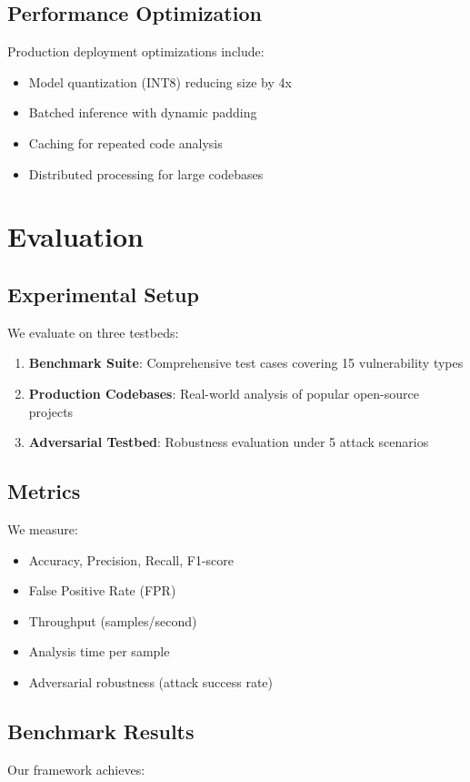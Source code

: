 \documentclass[10pt,journal,compsoc]{IEEEtran}
\begin{document}
\subsection{Performance Optimization}
Production deployment optimizations include:
\begin{itemize}
\item Model quantization (INT8) reducing size by 4x
\item Batched inference with dynamic padding
\item Caching for repeated code analysis
\item Distributed processing for large codebases
\end{itemize}

\section{Evaluation}

\subsection{Experimental Setup}
We evaluate on three testbeds:
\begin{enumerate}
\item \textbf{Benchmark Suite}: Comprehensive test cases covering 15 vulnerability types
\item \textbf{Production Codebases}: Real-world analysis of popular open-source projects
\item \textbf{Adversarial Testbed}: Robustness evaluation under 5 attack scenarios
\end{enumerate}

\subsection{Metrics}
We measure:
\begin{itemize}
\item Accuracy, Precision, Recall, F1-score
\item False Positive Rate (FPR)
\item Throughput (samples/second)
\item Analysis time per sample
\item Adversarial robustness (attack success rate)
\end{itemize}

\subsection{Benchmark Results}
Our framework achieves:
\end{document}
